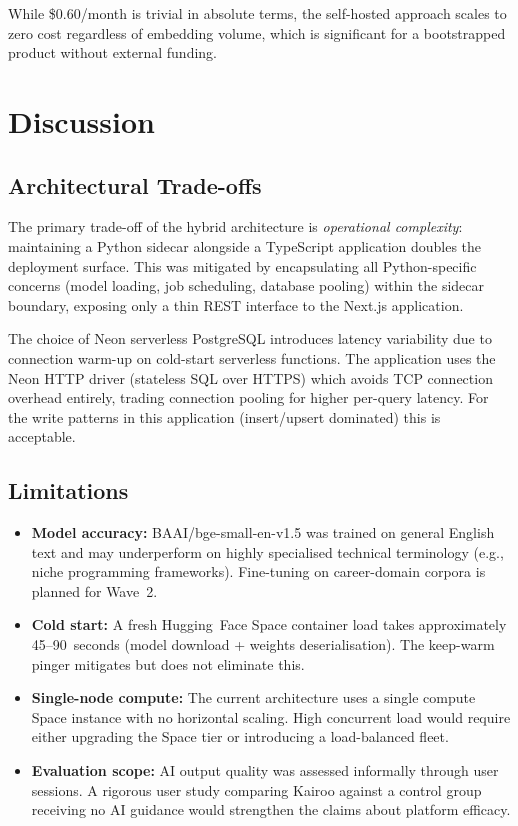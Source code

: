 \documentclass[conference]{IEEEtran}
\begin{document}
While \$0.60/month is trivial in absolute terms, the self-hosted approach
scales to zero cost regardless of embedding volume, which is significant
for a bootstrapped product without external funding.

\section{Discussion}
\label{sec:discuss}

\subsection{Architectural Trade-offs}

The primary trade-off of the hybrid architecture is \emph{operational
complexity}: maintaining a Python sidecar alongside a TypeScript application
doubles the deployment surface. This was mitigated by encapsulating all
Python-specific concerns (model loading, job scheduling, database pooling)
within the sidecar boundary, exposing only a thin REST interface to the
Next.js application.

The choice of Neon serverless PostgreSQL introduces latency variability due
to connection warm-up on cold-start serverless functions. The application
uses the Neon HTTP driver (stateless SQL over HTTPS) which avoids TCP
connection overhead entirely, trading connection pooling for higher per-query
latency. For the write patterns in this application (insert/upsert dominated)
this is acceptable.

\subsection{Limitations}

\begin{itemize}
  \item \textbf{Model accuracy:} BAAI/bge-small-en-v1.5 was trained on
        general English text and may underperform on highly specialised
        technical terminology (e.g., niche programming frameworks).
        Fine-tuning on career-domain corpora is planned for Wave~2.
  \item \textbf{Cold start:} A fresh Hugging~Face Space container load
        takes approximately 45--90~seconds (model download + weights
        deserialisation). The keep-warm pinger mitigates but does not
        eliminate this.
  \item \textbf{Single-node compute:} The current architecture uses a
        single compute Space instance with no horizontal scaling. High
        concurrent load would require either upgrading the Space tier
        or introducing a load-balanced fleet.
  \item \textbf{Evaluation scope:} AI output quality was assessed
        informally through user sessions. A rigorous user study comparing
        Kairoo against a control group receiving no AI guidance would
        strengthen the claims about platform efficacy.
\end{itemize}
\end{document}
